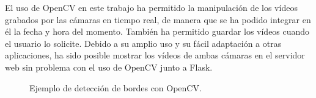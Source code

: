 El uso de OpenCV en este trabajo ha permitido la manipulación de los vídeos grabados por las cámaras en tiempo real, de manera que se ha podido integrar en él la fecha y hora del momento. También ha permitido guardar los vídeos cuando el usuario lo solicite. Debido a su amplio uso y su fácil adaptación a otras aplicaciones, ha sido posible mostrar los vídeos de ambas cámaras en el servidor web sin problema con el uso de OpenCV junto a Flask.\\
\begin{figure}[h!]
  \begin{center}
    \hspace{9mm}
    \hspace{9mm}
    \hspace{9mm}
  \end{center}
\caption{Ejemplo de detección de bordes con OpenCV.} \label{fig:ej-opencv}
\end{figure}
